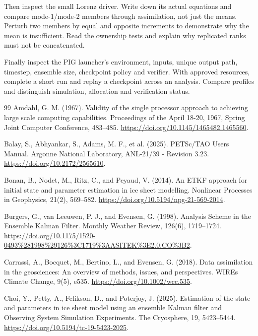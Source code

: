 \documentclass[11pt,a4paper]{article}
\begin{document}
Then inspect the small Lorenz driver. Write down its actual equations and compare mode-1/mode-2 members through assimilation, not just the means. Perturb two members by equal and opposite increments to demonstrate why the mean is insufficient. Read the ownership tests and explain why replicated ranks must not be concatenated.

Finally inspect the PIG launcher's environment, inputs, unique output path, timestep, ensemble size, checkpoint policy and verifier. With approved resources, complete a short run and replay a checkpoint across an analysis. Compare profiles and distinguish simulation, allocation and verification status.

\clearpage
\begin{thebibliography}{99}
 Amdahl, G. M. (1967). Validity of the single processor approach to achieving large scale computing capabilities. Proceedings of the April 18-20, 1967, Spring Joint Computer Conference, 483--485. \url{https://doi.org/10.1145/1465482.1465560}.

 Balay, S., Abhyankar, S., Adams, M. F., et al. (2025). PETSc/TAO Users Manual. Argonne National Laboratory, ANL-21/39 - Revision 3.23. \url{https://doi.org/10.2172/2565610}.

 Bonan, B., Nodet, M., Ritz, C., and Peyaud, V. (2014). An ETKF approach for initial state and parameter estimation in ice sheet modelling. Nonlinear Processes in Geophysics, 21(2), 569--582. \url{https://doi.org/10.5194/npg-21-569-2014}.

 Burgers, G., van Leeuwen, P. J., and Evensen, G. (1998). Analysis Scheme in the Ensemble Kalman Filter. Monthly Weather Review, 126(6), 1719--1724. \url{https://doi.org/10.1175/1520-0493%281998%29126%3C1719%3AASITEK%3E2.0.CO%3B2}.

 Carrassi, A., Bocquet, M., Bertino, L., and Evensen, G. (2018). Data assimilation in the geosciences: An overview of methods, issues, and perspectives. WIREs Climate Change, 9(5), e535. \url{https://doi.org/10.1002/wcc.535}.

 Choi, Y., Petty, A., Felikson, D., and Poterjoy, J. (2025). Estimation of the state and parameters in ice sheet model using an ensemble Kalman filter and Observing System Simulation Experiments. The Cryosphere, 19, 5423--5444. \url{https://doi.org/10.5194/tc-19-5423-2025}.


\end{thebibliography}
\end{document}

